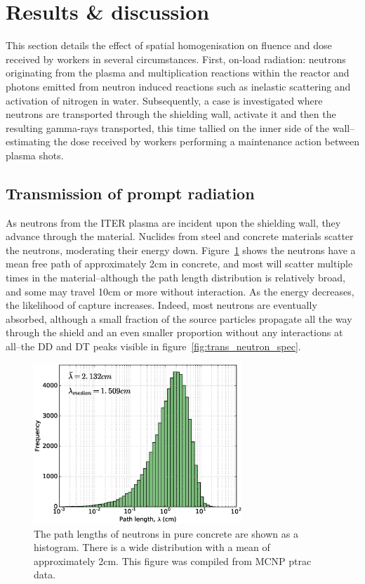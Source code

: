 \section{Results \& discussion}
This section details the effect of spatial homogenisation on fluence and dose received by workers in several circumstances. First, on-load radiation: neutrons originating from the plasma and multiplication reactions within the reactor and photons emitted from neutron induced reactions such as inelastic scattering and activation of nitrogen in water. Subsequently, a case is investigated where neutrons are transported through the shielding wall, activate it and then the resulting gamma-rays transported, this time tallied on the inner side of the wall--estimating the dose received by workers performing a maintenance action between plasma shots.

\subsection{Transmission of prompt radiation}
\label{subsec:prompt}
As neutrons from the ITER plasma are incident upon the shielding wall, they advance through the material. Nuclides from steel and concrete materials scatter the neutrons, moderating their energy down. Figure~\ref{fig:mfp} shows the neutrons have a mean free path of approximately 2cm in concrete, and most will scatter multiple times in the material--although the path length distribution is relatively broad, and some may travel 10cm or more without interaction. As the energy decreases, the likelihood of capture increases. Indeed, most neutrons are eventually absorbed, although a small fraction of the source particles propagate all the way through the shield and an even smaller proportion without any interactions at all--the DD and DT peaks visible in figure~\ref{fig:trans_neutron_spec}. 

\begin{figure}[H]
  \centering
  \includegraphics[width=0.7\textwidth]{mfp}
  \caption[Neutron path length histogram.]{The path lengths of neutrons in pure concrete are shown as a histogram. There is a wide distribution with a mean of approximately 2cm. This figure was compiled from MCNP ptrac data.}
  \label{fig:mfp}
\end{figure}

